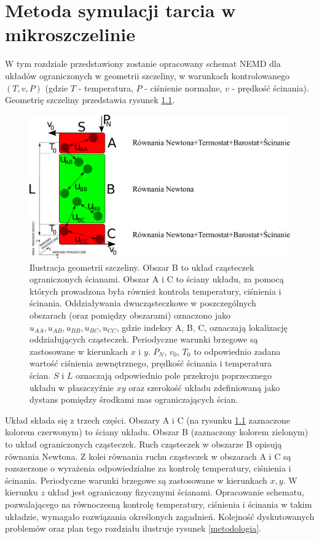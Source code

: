 \documentclass[12pt,a4paper,openright]{report} %
\begin{document}
\chapter{Metoda symulacji tarcia w mikroszczelinie}
\label{metody}
W tym rozdziale przedstawiony zostanie opracowany schemat NEMD dla układów ograniczonych w geometrii szczeliny, w warunkach kontrolowanego $(T, v, P)$ (gdzie $T$ - temperatura, $P$ - ciśnienie normalne, $v$ - prędkość ścinania). Geometrię szczeliny przedstawia rysunek \ref{szczelina}. 
\begin{figure}[h!]
\centering
\includegraphics[width=15cm, clip]{rysunki/szczelina.pdf}
\caption{Ilustracja geometrii szczeliny. Obszar B to układ cząsteczek ograniczonych ścianami. Obszar A i C to ściany układu, za pomocą których prowadzona była również kontrola temperatury, ciśnienia i ścinania. Oddziaływania dwucząsteczkowe w poszczególnych obszarach (oraz pomiędzy obszarami) oznaczono jako $u_{AA}, u_{AB}, u_{BB}, u_{BC}, u_{CC}$, gdzie indeksy A, B, C, oznaczają lokalizację oddziałujących cząsteczek. Periodyczne warunki brzegowe są zastosowane w kierunkach $x$ i $y$. $P_N$, $v_0$, $T_0$ to odpowiednio zadana wartość ciśnienia zewnętrznego, prędkość ścinania i temperatura ścian. $S$ i $L$ oznaczają odpowiednio pole przekroju poprzecznego układu w płaszczyźnie $xy$ oraz szerokość układu zdefiniowaną jako dystans pomiędzy środkami mas ograniczających ścian.}
\label{szczelina}
\end{figure}
Układ składa się z trzech części. Obszary A i C (na rysunku \ref{szczelina} zaznaczone kolorem czerwonym) to ściany układu. Obszar B (zaznaczony kolorem zielonym) to układ ograniczonych cząsteczek. Ruch cząsteczek w obszarze B opisują równania Newtona. Z kolei równania ruchu cząsteczek w obszarach A i C są rozszerzone o wyrażenia odpowiedzialne za kontrolę temperatury, ciśnienia i ścinania. Periodyczne warunki brzegowe są zastosowane w kierunkach $x, y$. W kierunku $z$ układ jest ograniczony fizycznymi ścianami. Opracowanie schematu, pozwalającego na równoczesną kontrolę temperatury, ciśnienia i ścinania w takim układzie, wymagało rozwiązania określonych zagadnień. Kolejność dyskutowanych problemów oraz plan tego rozdziału ilustruje rysunek \ref{metodologia}. 
\end{document}
